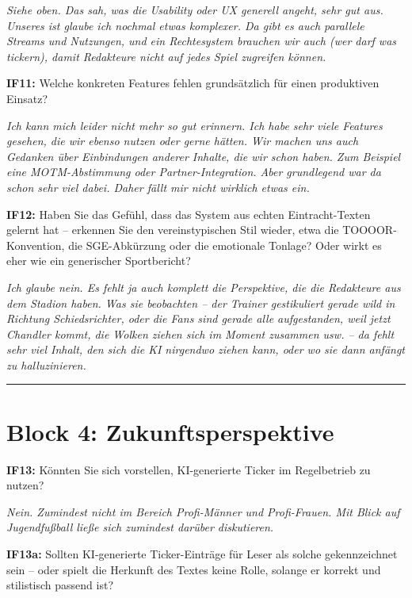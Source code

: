 \textit{Siehe oben. Das sah, was die Usability oder UX generell angeht, sehr gut aus. Unseres ist glaube ich nochmal etwas komplexer. Da gibt es auch parallele Streams und Nutzungen, und ein Rechtesystem brauchen wir auch (wer darf was tickern), damit Redakteure nicht auf jedes Spiel zugreifen können.}

\textbf{IF11:} Welche konkreten Features fehlen grundsätzlich für einen produktiven Einsatz?

\textit{Ich kann mich leider nicht mehr so gut erinnern. Ich habe sehr viele Features gesehen, die wir ebenso nutzen oder gerne hätten. Wir machen uns auch Gedanken über Einbindungen anderer Inhalte, die wir schon haben. Zum Beispiel eine MOTM-Abstimmung oder Partner-Integration. Aber grundlegend war da schon sehr viel dabei. Daher fällt mir nicht wirklich etwas ein.}

\textbf{IF12:} Haben Sie das Gefühl, dass das System aus echten Eintracht-Texten gelernt hat -- erkennen Sie den vereinstypischen Stil wieder, etwa die TOOOOR-Konvention, die SGE-Abkürzung oder die emotionale Tonlage? Oder wirkt es eher wie ein generischer Sportbericht?

\textit{Ich glaube nein. Es fehlt ja auch komplett die Perspektive, die die Redakteure aus dem Stadion haben. Was sie beobachten -- der Trainer gestikuliert gerade wild in Richtung Schiedsrichter, oder die Fans sind gerade alle aufgestanden, weil jetzt Chandler kommt, die Wolken ziehen sich im Moment zusammen usw. -- da fehlt sehr viel Inhalt, den sich die KI nirgendwo ziehen kann, oder wo sie dann anfängt zu halluzinieren.}

\begin{center}\rule{0.5\linewidth}{0.5pt}\end{center}

\section{Block 4: Zukunftsperspektive}

\textbf{IF13:} Könnten Sie sich vorstellen, KI-generierte Ticker im Regelbetrieb zu nutzen?

\textit{Nein. Zumindest nicht im Bereich Profi-Männer und Profi-Frauen. Mit Blick auf Jugendfußball ließe sich zumindest darüber diskutieren.}

\textbf{IF13a:} Sollten KI-generierte Ticker-Einträge für Leser als solche gekennzeichnet sein -- oder spielt die Herkunft des Textes keine Rolle, solange er korrekt und stilistisch passend ist?

